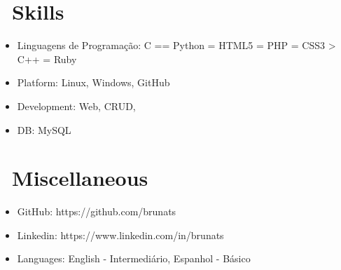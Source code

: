\documentclass{resume}
\begin{document}
\section{\faCogs\ Skills}
\begin{itemize}[parsep=0.5ex]
  \item Linguagens de Programação: C == Python = HTML5 = PHP = CSS3 > C++ = Ruby
  \item Platform: Linux, Windows, GitHub
  \item Development: Web, CRUD,
  \item DB: MySQL
\end{itemize}

\section{\faInfo\ Miscellaneous}
\begin{itemize}[parsep=0.5ex]
  \item GitHub: https://github.com/brunats
  \item Linkedin: https://www.linkedin.com/in/brunats
  \item Languages: English - Intermediário, Espanhol - Básico
\end{itemize}

%
%
\end{document}
